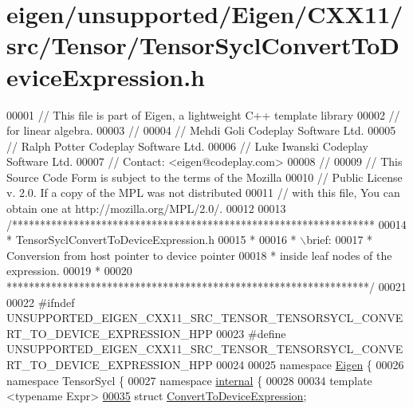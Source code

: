 \hypertarget{eigen_2unsupported_2_eigen_2_c_x_x11_2src_2_tensor_2_tensor_sycl_convert_to_device_expression_8h_source}{}\section{eigen/unsupported/\+Eigen/\+C\+X\+X11/src/\+Tensor/\+Tensor\+Sycl\+Convert\+To\+Device\+Expression.h}
\label{eigen_2unsupported_2_eigen_2_c_x_x11_2src_2_tensor_2_tensor_sycl_convert_to_device_expression_8h_source}

\begin{DoxyCode}
00001 \textcolor{comment}{// This file is part of Eigen, a lightweight C++ template library}
00002 \textcolor{comment}{// for linear algebra.}
00003 \textcolor{comment}{//}
00004 \textcolor{comment}{// Mehdi Goli    Codeplay Software Ltd.}
00005 \textcolor{comment}{// Ralph Potter  Codeplay Software Ltd.}
00006 \textcolor{comment}{// Luke Iwanski  Codeplay Software Ltd.}
00007 \textcolor{comment}{// Contact: <eigen@codeplay.com>}
00008 \textcolor{comment}{//}
00009 \textcolor{comment}{// This Source Code Form is subject to the terms of the Mozilla}
00010 \textcolor{comment}{// Public License v. 2.0. If a copy of the MPL was not distributed}
00011 \textcolor{comment}{// with this file, You can obtain one at http://mozilla.org/MPL/2.0/.}
00012 
00013 \textcolor{comment}{/*****************************************************************}
00014 \textcolor{comment}{ * TensorSyclConvertToDeviceExpression.h}
00015 \textcolor{comment}{ *}
00016 \textcolor{comment}{ * \(\backslash\)brief:}
00017 \textcolor{comment}{ *  Conversion from host pointer to device pointer}
00018 \textcolor{comment}{ *  inside leaf nodes of the expression.}
00019 \textcolor{comment}{ *}
00020 \textcolor{comment}{*****************************************************************/}
00021 
00022 \textcolor{preprocessor}{#ifndef UNSUPPORTED\_EIGEN\_CXX11\_SRC\_TENSOR\_TENSORSYCL\_CONVERT\_TO\_DEVICE\_EXPRESSION\_HPP}
00023 \textcolor{preprocessor}{#define UNSUPPORTED\_EIGEN\_CXX11\_SRC\_TENSOR\_TENSORSYCL\_CONVERT\_TO\_DEVICE\_EXPRESSION\_HPP}
00024 
00025 \textcolor{keyword}{namespace }\hyperlink{namespace_eigen}{Eigen} \{
00026 \textcolor{keyword}{namespace }TensorSycl \{
00027 \textcolor{keyword}{namespace }\hyperlink{namespaceinternal}{internal} \{
00028 
00034 \textcolor{keyword}{template} <\textcolor{keyword}{typename} Expr>
\hyperlink{struct_eigen_1_1_tensor_sycl_1_1internal_1_1_convert_to_device_expression}{00035} \textcolor{keyword}{struct }\hyperlink{struct_eigen_1_1_tensor_sycl_1_1internal_1_1_convert_to_device_expression}{ConvertToDeviceExpression};

\end{DoxyCode}
